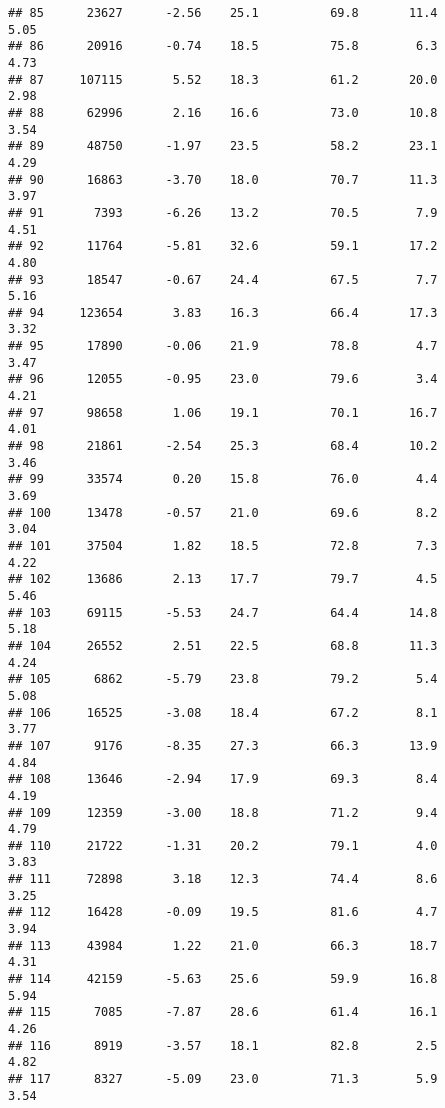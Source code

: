 \documentclass[
]{article}
\begin{document}
\begin{verbatim}
## 85      23627      -2.56    25.1          69.8       11.4              5.05
## 86      20916      -0.74    18.5          75.8        6.3              4.73
## 87     107115       5.52    18.3          61.2       20.0              2.98
## 88      62996       2.16    16.6          73.0       10.8              3.54
## 89      48750      -1.97    23.5          58.2       23.1              4.29
## 90      16863      -3.70    18.0          70.7       11.3              3.97
## 91       7393      -6.26    13.2          70.5        7.9              4.51
## 92      11764      -5.81    32.6          59.1       17.2              4.80
## 93      18547      -0.67    24.4          67.5        7.7              5.16
## 94     123654       3.83    16.3          66.4       17.3              3.32
## 95      17890      -0.06    21.9          78.8        4.7              3.47
## 96      12055      -0.95    23.0          79.6        3.4              4.21
## 97      98658       1.06    19.1          70.1       16.7              4.01
## 98      21861      -2.54    25.3          68.4       10.2              3.46
## 99      33574       0.20    15.8          76.0        4.4              3.69
## 100     13478      -0.57    21.0          69.6        8.2              3.04
## 101     37504       1.82    18.5          72.8        7.3              4.22
## 102     13686       2.13    17.7          79.7        4.5              5.46
## 103     69115      -5.53    24.7          64.4       14.8              5.18
## 104     26552       2.51    22.5          68.8       11.3              4.24
## 105      6862      -5.79    23.8          79.2        5.4              5.08
## 106     16525      -3.08    18.4          67.2        8.1              3.77
## 107      9176      -8.35    27.3          66.3       13.9              4.84
## 108     13646      -2.94    17.9          69.3        8.4              4.19
## 109     12359      -3.00    18.8          71.2        9.4              4.79
## 110     21722      -1.31    20.2          79.1        4.0              3.83
## 111     72898       3.18    12.3          74.4        8.6              3.25
## 112     16428      -0.09    19.5          81.6        4.7              3.94
## 113     43984       1.22    21.0          66.3       18.7              4.31
## 114     42159      -5.63    25.6          59.9       16.8              5.94
## 115      7085      -7.87    28.6          61.4       16.1              4.26
## 116      8919      -3.57    18.1          82.8        2.5              4.82
## 117      8327      -5.09    23.0          71.3        5.9              3.54

\end{verbatim}
\end{document}
